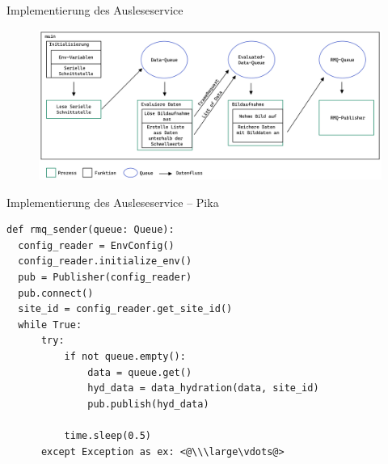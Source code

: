 \documentclass[10pt,ngerman]{beamer}
\begin{document}




\begin{frame}[fragile]{Implementierung des Ausleseservice}
  \begin{figure}[htpb]
    \centering
    \includegraphics[width=1\textwidth]{pics/DataReaderDataFlow.png}
  \end{figure}
\end{frame}


\begin{frame}[fragile]{Implementierung des Ausleseservice -- Pika}
  \begin{lstlisting}[style=MyPythonStyle,
    breaklines=true, firstnumber=75]
def rmq_sender(queue: Queue):
  config_reader = EnvConfig()
  config_reader.initialize_env()
  pub = Publisher(config_reader)
  pub.connect()
  site_id = config_reader.get_site_id()
  while True:
      try:
          if not queue.empty():
              data = queue.get()
              hyd_data = data_hydration(data, site_id)
              pub.publish(hyd_data)

          time.sleep(0.5)
      except Exception as ex: <@\\\large\vdots@>
\end{lstlisting}
\end{frame}
\end{document}

